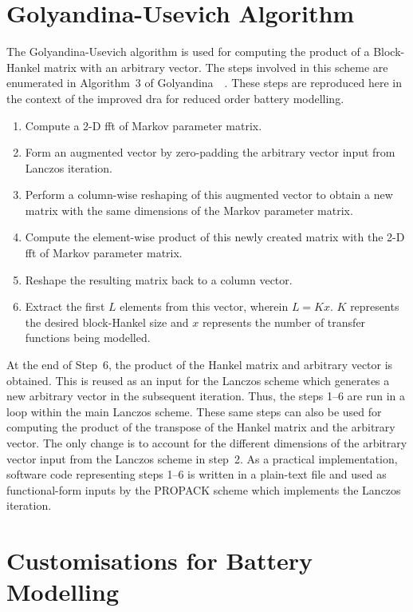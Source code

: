 \section{Golyandina-Usevich Algorithm\label{sec:Golyandina-Usevich-Algorithm}}

The  Golyandina-Usevich  algorithm  is  used  for computing  the  product  of  a
Block-Hankel matrix with an arbitrary vector.  The steps involved in this scheme
are enumerated  in Algorithm~3 of  Golyandina~\etal~\cite{Golyandina2015}. These
steps are reproduced  here in the context of the  improved \gls{dra} for reduced
order battery modelling.

\begin{enumerate}
	\item Compute a 2-D \gls{fft} of Markov parameter matrix.
	\item Form an augmented vector by zero-padding the arbitrary vector input
	    from Lanczos iteration.
	\item Perform a column-wise reshaping of this augmented vector to obtain
	    a new matrix with the same dimensions of the Markov parameter matrix.
	\item Compute the element-wise product of this newly created matrix with
	    the 2-D \gls{fft} of Markov parameter matrix.
	\item Reshape the resulting matrix back to a column vector.
	\item Extract the first $L$ elements from this vector, wherein $L=K x$.
	    $K$ represents the desired block-Hankel size and $x$ represents
	    the number of transfer functions being modelled.
\end{enumerate}

At the end of  Step~6, the product of the Hankel matrix  and arbitrary vector is
obtained. This is  reused as an input  for the Lanczos scheme  which generates a
new arbitrary vector  in the subsequent iteration. Thus, the  steps 1--6 are run
in a loop within the main Lanczos scheme.  These same steps can also be used for
computing the  product of the transpose  of the Hankel matrix  and the arbitrary
vector.  The only  change is  to  account for  the different  dimensions of  the
arbitrary  vector input  from  the  Lanczos scheme  in  step~2.  As a  practical
implementation, software code representing steps 1--6 is written in a plain-text
file and used  as functional-form inputs by the PROPACK  scheme which implements
the Lanczos iteration.

\section{Customisations for Battery Modelling}

